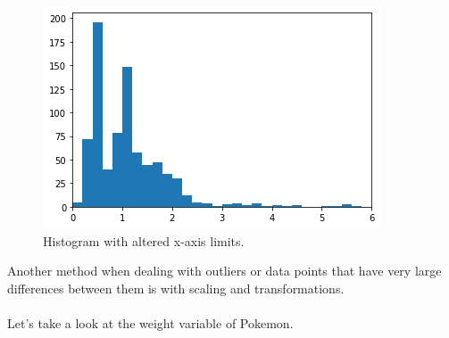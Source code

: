 \begin{figure}
	\includegraphics{images/figure11.png}
	\caption{Histogram with altered x-axis limits.}\label{fig:figure11}
\end{figure}

Another method when dealing with outliers or data points that have very large differences between them is with scaling and transformations.
\\\\
Let's take a look at the weight variable of Pokemon.

